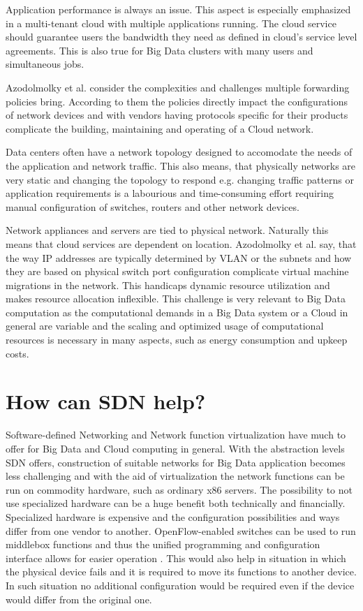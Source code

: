 \documentclass{acm_proc_article-sp}
\begin{document}
Application performance is always an issue. This aspect is especially emphasized in a multi-tenant cloud with multiple applications running. The cloud service should guarantee users the bandwidth they need as defined in cloud's service level agreements. This is also true for Big Data clusters with many users and simultaneous jobs.

Azodolmolky et al. consider the complexities and challenges multiple forwarding policies bring. According to them the policies directly impact the configurations of network devices and with vendors having protocols specific for their products complicate the building, maintaining and operating of a Cloud network.

Data centers often have a network topology designed to accomodate the needs of the application and network traffic. This also means, that physically networks are very static and changing the topology to respond e.g. changing traffic patterns or application requirements is a labourious and time-consuming effort requiring manual configuration of switches, routers and other network devices.

Network appliances and servers are tied to physical network. Naturally this means that cloud services are dependent on location. Azodolmolky et al. say, that the way IP addresses are typically determined by VLAN or the subnets and how they are based on physical switch port configuration complicate virtual machine migrations in the network. This handicaps dynamic resource utilization and makes resource allocation inflexible. This challenge is very relevant to Big Data computation as the computational demands in a Big Data system or a Cloud in general are variable and the scaling and optimized usage of computational resources is necessary \cite{Frontiers} in many aspects, such as energy consumption and upkeep costs.

\section{How can SDN help?}


Software-defined Networking and Network function virtualization have much to offer for Big Data and Cloud computing in general. With the abstraction levels SDN offers, construction of suitable networks for Big Data application becomes less challenging and with the aid of virtualization the network functions can be run on commodity hardware, such as ordinary x86 servers. The possibility to not use specialized hardware can be a huge benefit both technically and financially. Specialized hardware is expensive and the configuration possibilities and ways differ from one vendor to another. OpenFlow-enabled switches can be used to run middlebox functions and thus the unified programming and configuration interface allows for easier operation . This would also help in situation in which the physical device fails and it is required to move its functions to another device. In such situation no additional configuration would be required even if the device would differ from the original one. 
\end{document}
